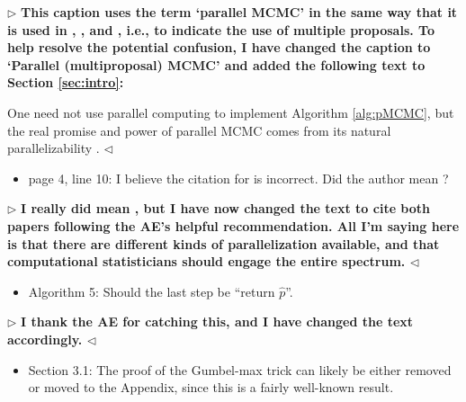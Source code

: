 \documentclass[12pt]{article}
\newenvironment{reply}{$\triangleright$\bfseries}{$\triangleleft$}
\renewenvironment{quote}
               {\list{}{\rightmargin\leftmargin}%
                \item\relax\normalfont}
               {\endlist}
\begin{document}
\begin{reply}
	This caption uses the term `parallel MCMC' in the same way that it is used in \citet{calderhead2014general}, \citet{schwedes2019parallel}, \citet{schwedes2021rao} and \citet{glatt}, i.e., to indicate the use of multiple proposals.  To help resolve the potential confusion, I have changed the caption to `Parallel (multiproposal) MCMC' and added the following text to Section \ref{sec:intro}:  
	\begin{quote}
		One need not use parallel computing to implement Algorithm \ref{alg:pMCMC}, but the real promise and power of parallel MCMC comes from its natural parallelizability \citep{calderhead2014general}. 
	\end{quote}
\end{reply}

\begin{itemize}

	\item page 4, line 10: I believe the citation for \citet{gelman1992inference} is incorrect. Did the author mean \citet{gelman1992single}?

\end{itemize}

\begin{reply}
	I really did mean \citet{gelman1992inference}, but I have now changed the text to cite both papers following the AE's helpful recommendation.  All I'm saying here is that there are different kinds of parallelization available, and that computational statisticians should engage the entire spectrum.  
\end{reply}

\begin{itemize}
	
	\item Algorithm 5: Should the last step be ``return $\hat{p}$''.
	
\end{itemize}

\begin{reply}
	I thank the AE for catching this, and I have changed the text accordingly.
\end{reply}

\begin{itemize}
	
	\item Section 3.1: The proof of the Gumbel-max trick can likely be either removed or
	moved to the Appendix, since this is a fairly well-known result.

\end{itemize}
\end{document}
